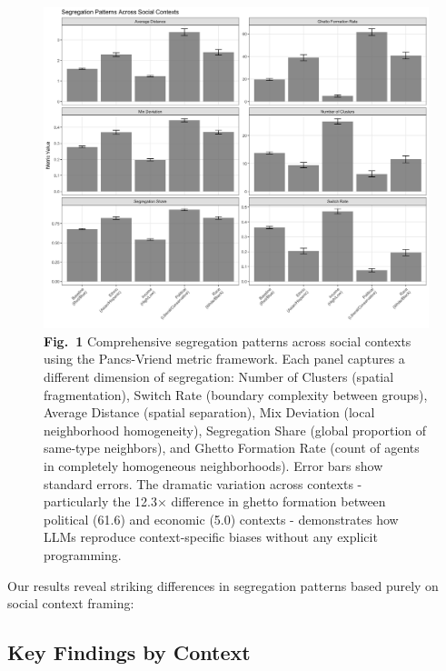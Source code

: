 \documentclass[pdflatex,sn-basic]{sn-jnl}%
\begin{document}
\begin{figure}[ht]
\centering
\includegraphics[width=\textwidth]{figures/segregation-comparison-1.png}
\caption{\textbf{Fig.~1} Comprehensive segregation patterns across social
contexts using the Pancs-Vriend metric framework. Each panel captures a
different dimension of segregation: Number of Clusters (spatial
fragmentation), Switch Rate (boundary complexity between groups),
Average Distance (spatial separation), Mix Deviation (local neighborhood
homogeneity), Segregation Share (global proportion of same-type
neighbors), and Ghetto Formation Rate (count of agents in completely
homogeneous neighborhoods). Error bars show standard errors. The
dramatic variation across contexts - particularly the 12.3× difference
in ghetto formation between political (61.6) and economic (5.0) contexts
- demonstrates how LLMs reproduce context-specific biases without any
explicit programming.}
\label{fig:segregation-comparison}
\end{figure}

Our results reveal striking differences in segregation patterns based
purely on social context framing:

\subsection{Key Findings by Context}\label{key-findings-by-context}

\end{document}
